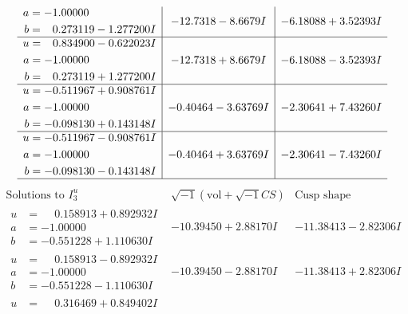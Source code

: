 \documentclass[1p]{elsarticle_modified}
\theoremstyle{definition}
\newcommand{\I}{\sqrt{-1}}
\begin{document}
$$\begin{array}{c|c|c}
\begin{aligned}
a &= -1.00000\phantom{ +0.000000I} \\
b &= \phantom{-}0.273119 - 1.277200 I\end{aligned}
 & -12.7318 - 8.6679 I & -6.18088 + 3.52393 I \\ \hline\begin{aligned}
u &= \phantom{-}0.834900 - 0.622023 I \\
a &= -1.00000\phantom{ +0.000000I} \\
b &= \phantom{-}0.273119 + 1.277200 I\end{aligned}
 & -12.7318 + 8.6679 I & -6.18088 - 3.52393 I \\ \hline\begin{aligned}
u &= -0.511967 + 0.908761 I \\
a &= -1.00000\phantom{ +0.000000I} \\
b &= -0.098130 + 0.143148 I\end{aligned}
 & -0.40464 - 3.63769 I & -2.30641 + 7.43260 I \\ \hline\begin{aligned}
u &= -0.511967 - 0.908761 I \\
a &= -1.00000\phantom{ +0.000000I} \\
b &= -0.098130 - 0.143148 I\end{aligned}
 & -0.40464 + 3.63769 I & -2.30641 - 7.43260 I\\
 \hline 
 \end{array}$$\newpage$$\begin{array}{c|c|c}  
\text{Solutions to }I^u_{3}& \I (\text{vol} + \sqrt{-1}CS) & \text{Cusp shape}\\
 \hline 
\begin{aligned}
u &= \phantom{-}0.158913 + 0.892932 I \\
a &= -1.00000\phantom{ +0.000000I} \\
b &= -0.551228 + 1.110630 I\end{aligned}
 & -10.39450 + 2.88170 I & -11.38413 - 2.82306 I \\ \hline\begin{aligned}
u &= \phantom{-}0.158913 - 0.892932 I \\
a &= -1.00000\phantom{ +0.000000I} \\
b &= -0.551228 - 1.110630 I\end{aligned}
 & -10.39450 - 2.88170 I & -11.38413 + 2.82306 I \\ \hline\begin{aligned}
u &= \phantom{-}0.316469 + 0.849402 I \\

\end{aligned}
\end{array}$$
\end{document}
